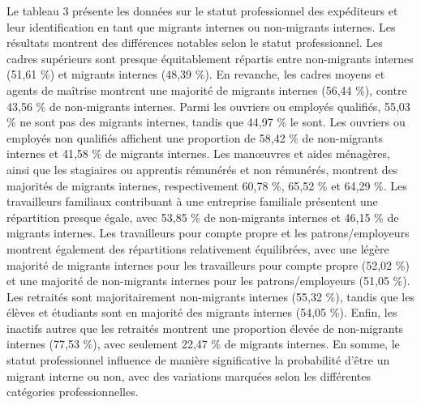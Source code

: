 \documentclass[a4paper,12pt]{article}
\begin{document}
\newpage 


Le tableau 3 présente les données sur le statut professionnel des expéditeurs et leur identification en tant que migrants internes ou non-migrants internes. Les résultats montrent des différences notables selon le statut professionnel.
Les cadres supérieurs sont presque équitablement répartis entre non-migrants internes (51,61 \%) et migrants internes (48,39 \%). En revanche, les cadres moyens et agents de maîtrise montrent une majorité de migrants internes (56,44 \%), contre 43,56 \% de non-migrants internes. Parmi les ouvriers ou employés qualifiés, 55,03 \% ne sont pas des migrants internes, tandis que 44,97 \% le sont.
Les ouvriers ou employés non qualifiés affichent une proportion de 58,42 \% de non-migrants internes et 41,58 \% de migrants internes. Les manœuvres et aides ménagères, ainsi que les stagiaires ou apprentis rémunérés et non rémunérés, montrent des majorités de migrants internes, respectivement 60,78 \%, 65,52 \% et 64,29 \%. Les travailleurs familiaux contribuant à une entreprise familiale présentent une répartition presque égale, avec 53,85 \% de non-migrants internes et 46,15 \% de migrants internes.
Les travailleurs pour compte propre et les patrons/employeurs montrent également des répartitions relativement équilibrées, avec une légère majorité de migrants internes pour les travailleurs pour compte propre (52,02 \%) et une majorité de non-migrants internes pour les patrons/employeurs (51,05 \%). Les retraités sont majoritairement non-migrants internes (55,32 \%), tandis que les élèves et étudiants sont en majorité des migrants internes (54,05 \%). Enfin, les inactifs autres que les retraités montrent une proportion élevée de non-migrants internes (77,53 \%), avec seulement 22,47 \% de migrants internes.
En somme, le statut professionnel influence de manière significative la probabilité d'être un migrant interne ou non, avec des variations marquées selon les différentes catégories professionnelles.
\end{document}
